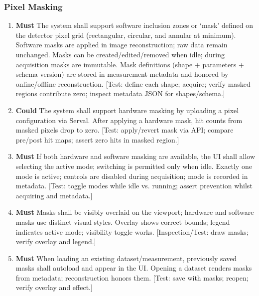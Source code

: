 \documentclass[12pt]{article}
\newcommand{\PriorityTag}[2]{%
  \colorbox{#2!25}{\footnotesize\textsf{\textbf{#1}}}\hspace{0.6em}}
\newcommand{\must}{\leavevmode\PriorityTag{Must}{green}}
\newcommand{\could}{\leavevmode\PriorityTag{Could}{cyan}}
\newcounter{reqgrp}[section] %
\newcounter{reqno}
\newcommand{\reqprefix}{GEN}
\newenvironment{requirements}[1]{%
  \renewcommand{\reqprefix}{#1}%
  \refstepcounter{reqgrp}%
  \setcounter{reqno}{0}%
  \begin{enumerate}[leftmargin=*]
}{\end{enumerate}}
\begin{document}
\subsubsection{Pixel Masking}
\begin{requirements}{PMK}

\item \must {}
  {The system shall support software inclusion zones or `mask' defined on the detector pixel grid (rectangular, circular, and annular at minimum). Software masks are applied in image reconstruction; raw data remain unchanged.}
  {Masks can be created/edited/removed when idle; during acquisition masks are immutable. Mask definitions (shape + parameters + schema version) are stored in measurement metadata and honored by online/offline reconstruction.}
  [Test: define each shape; acquire; verify masked regions contribute zero; inspect metadata JSON for shapes/schema.]

\item \could {}
  {The system shall support hardware masking by uploading a pixel configuration via Serval. }
  {After applying a hardware mask, hit counts from masked pixels drop to zero.}
  [Test: apply/revert mask via API; compare pre/post hit maps; assert zero hits in masked region.]

\item \must {}
  {If both hardware and software masking are available, the UI shall allow selecting the active mode; switching is permitted only when idle.}
  {Exactly one mode is active; controls are disabled during acquisition; mode is recorded in metadata.}
  [Test: toggle modes while idle vs. running; assert prevention whilst acquiring and metadata.]

\item \must {}
  {Masks shall be visibly overlaid on the viewport; hardware and software masks use distinct visual styles.}
  {Overlay shows correct bounds; legend indicates active mode; visibility toggle works.}
  [Inspection/Test: draw masks; verify overlay and legend.]

\item \must {}
  {When loading an existing dataset/measurement, previously saved masks shall autoload and appear in the UI.}
  {Opening a dataset renders masks from metadata; reconstruction honors them.}
  [Test: save with masks; reopen; verify overlay and effect.]

\end{requirements}
\end{document}
